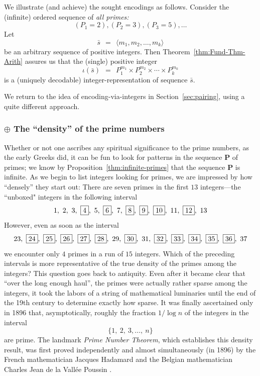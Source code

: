 \bigskip

We illustrate (and achieve) the sought encodings as follows.  Consider the (infinite) ordered sequence of {\em all primes:}
\[ (P_1 = 2), (P_2 = 3), (P_3 = 5), \ldots  \]
Let
\begin{equation}
\label{eq:sequence-vec-s}
\bar{s} \ \ = \ \ \langle m_1, m_2, \ldots, m_k \rangle
\end{equation}
be an arbitrary sequence of positive integers.  Then Theorem~\ref{thm:Fund-Thm-Arith} assures us that the (single) positive integer
\[  \iota(\bar{s}) \ \ = \ \ P_1^{m_1} \times P_2^{m_2} \times  \cdots \times P_k^{m_k} \]
is a (uniquely decodable) integer-representation of sequence $\bar{s}$.

\smallskip

We return to the idea of encoding-via-integers in Section~\ref{sec:pairing}, using a quite different approach.

\subsubsection{$\oplus$ The ``density'' of the prime numbers}
\label{sec:prime-density}

Whether or not one ascribes any spiritual significance to the prime numbers, as the early Greeks did, it can be fun to look for patterns in the sequence {\bf P} of primes; we know by Proposition~\ref{thm:infinite-primes} that the sequence {\bf P} is infinite.  As we begin to list integers looking for primes, we are impressed by how ``densely'' they start out:  There are seven primes in the first $13$ integers---the ``unboxed" integers in the following interval
\[ 1, \ 2, \ 3, \ \fbox{4}, \ 5, \ \fbox{6}, \ 7, \ \fbox{8}, \ \fbox{9}, \ \fbox{10}, \ 11, \ \fbox{12}, \ 13 \] However, even as soon as the interval
\[ 23, \ \fbox{24}, \ \fbox{25}, \ \fbox{26}, \ \fbox{27}, \ \fbox{28}, \ 29, \ \fbox{30}, \ 31, 
\ \fbox{32}, \ \fbox{33}, \ \fbox{34}, \ \fbox{35}, \ \fbox{36}, \ 37
\]
we encounter only $4$ primes in a run of $15$ integers.  Which of the preceding intervals is more representative of the true density of the primes among the integers?  This question goes back to antiquity.  Even after it became clear that ``over the long enough haul'', the primes were actually rather sparse among the integers, it took the labors of a string of mathematical luminaries until the  end of the 19th century to determine exactly how sparse.  It was finally ascertained only in 1896 that, asymptotically, roughly the fraction $1/ \log n$ of the integers in the interval
\[ \{ 1, \ 2, \ 3, \ldots, \ n \} \]
are prime.  The landmark {\it Prime Number Theorem}, which establishes this density result, was first proved independently and almost simultaneously (in 1896) by the French mathematician Jacques Hadamard  \cite{Hadamard} and the Belgian mathematician Charles Jean de la Vall\'{e}e Poussin \cite{Poussin}.
 

